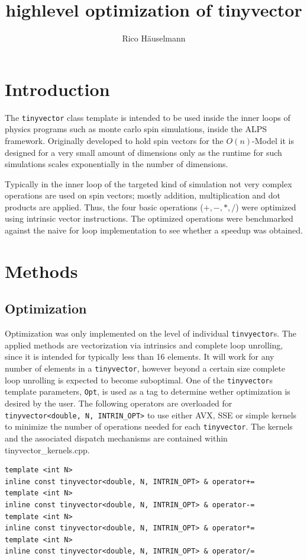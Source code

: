 \documentclass[a4paper]{scrartcl}
\author{Rico Häuselmann}
\title{highlevel optimization of tinyvector}
\begin{document}
\section*{Introduction}
The \texttt{tinyvector} class template is intended to be used inside the inner loops of physics programs such as monte carlo spin simulations,
inside the ALPS framework. Originally developed to hold spin vectors for the $O(n)$-Model it is designed for a very small amount of dimensions only
as the runtime for such simulations scales exponentially in the number of dimensions.

Typically in the inner loop of the targeted kind of simulation not very complex operations are used on spin vectors; mostly addition, multiplication
and dot products are applied. Thus, the four basic operations ($+, -, *, /$) were optimized using intrinsic vector instructions. 
The optimized operations were benchmarked against the naive for loop implementation to see whether a speedup was obtained.

\section*{Methods}
\subsection*{Optimization}
Optimization was only implemented on the level of individual \texttt{tinvyector}s. The applied methods are vectorization via intrinsics and complete loop unrolling, since it is intended for typically less than 16 elements. It will work for any number of elements in a \texttt{tinyvector}, however beyond a certain size complete loop unrolling is expected to become suboptimal.
One of the \texttt{tinyvector}s template parameters, \texttt{Opt}, is used as a tag to determine wether optimization is desired by the user.
The following operators are overloaded for \texttt{tinyvector<double, N, INTRIN\_OPT>} to use either AVX, SSE or simple kernels to minimize the number of operations needed for each \texttt{tinyvector}.
The kernels and the associated dispatch mechanisms are contained within tinyvector\_kernels.cpp.

\begin{lstlisting}
template <int N>
inline const tinyvector<double, N, INTRIN_OPT> & operator+=
template <int N> 
inline const tinyvector<double, N, INTRIN_OPT> & operator-=
template <int N> 
inline const tinyvector<double, N, INTRIN_OPT> & operator*=
template <int N> 
inline const tinyvector<double, N, INTRIN_OPT> & operator/=
\end{lstlisting}
\end{document}
